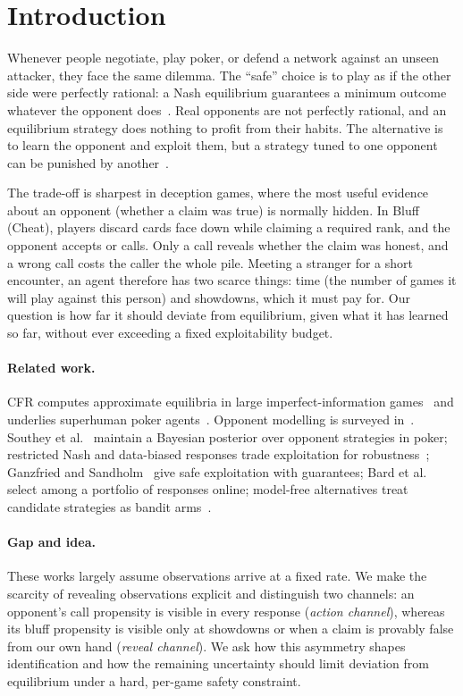 \documentclass[11pt]{article}
\newcommand{\new}[1]{\textcolor{blue!55!black}{#1}}
\begin{document}
\section{Introduction}
Whenever people negotiate, play poker, or defend a network against an unseen attacker, they face the same dilemma. The ``safe'' choice is to play as if the other side were perfectly rational: a Nash equilibrium guarantees a minimum outcome whatever the opponent does~\cite{shoham2008}. Real opponents are not perfectly rational, and an equilibrium strategy does nothing to profit from their habits. The alternative is to learn the opponent and exploit them, but a strategy tuned to one opponent can be punished by another~\cite{ganzfried2015}.

The trade-off is sharpest in deception games, where the most useful evidence about an opponent (whether a claim was true) is normally hidden. In Bluff (Cheat), players discard cards face down while claiming a required rank, and the opponent accepts or calls. Only a call reveals whether the claim was honest, and a wrong call costs the caller the whole pile. \new{Meeting a stranger for a short encounter, an agent therefore has two scarce things: time (the number of games it will play against this person) and showdowns, which it must pay for. Our question is how far it should deviate from equilibrium, given what it has learned so far, without ever exceeding a fixed exploitability budget.}

\paragraph{Related work.} CFR computes approximate equilibria in large imperfect-information games~\cite{zinkevich2007,lanctot2009,neller2013} and underlies superhuman poker agents~\cite{brown2018,brown2019}. Opponent modelling is surveyed in~\cite{albrecht2018}. Southey et al.~\cite{southey2005} maintain a Bayesian posterior over opponent strategies in poker; restricted Nash and data-biased responses trade exploitation for robustness~\cite{johanson2007,johanson2009}; Ganzfried and Sandholm~\cite{ganzfried2015} give safe exploitation with guarantees; Bard et al.~\cite{bard2013} select among a portfolio of responses online; model-free alternatives treat candidate strategies as bandit arms~\cite{auer2002ucb,auer2002exp3}.

\paragraph{Gap and idea.} These works largely assume observations arrive at a fixed rate. We make the scarcity of revealing observations explicit and distinguish two channels: an opponent's call propensity is visible in every response (\emph{action channel}), whereas its bluff propensity is visible only at showdowns or when a claim is provably false from our own hand (\emph{reveal channel}). We ask how this asymmetry shapes identification and how the remaining uncertainty should limit deviation from equilibrium \new{under a hard, per-game safety constraint}.
\end{document}
